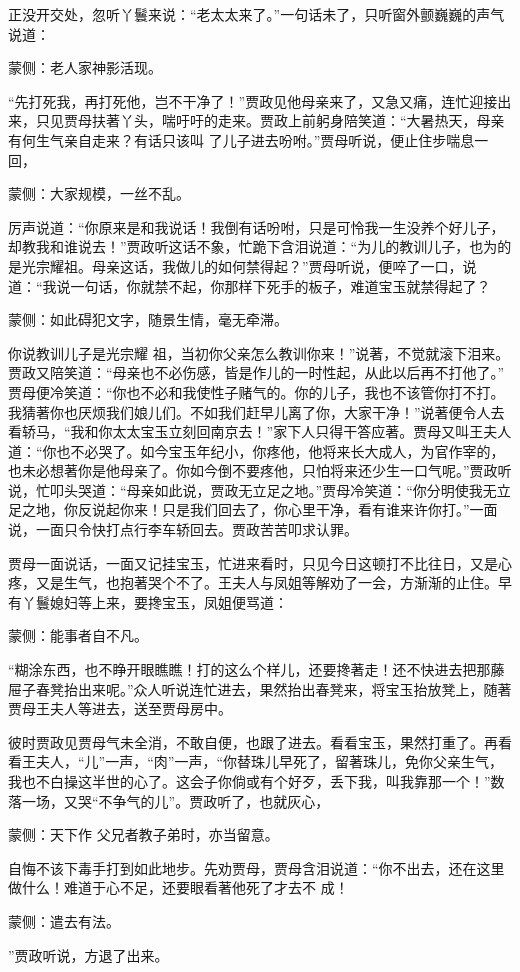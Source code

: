 \begin{parag}
    正没开交处，忽听丫鬟来说：“老太太来了。”一句话未了，只听窗外颤巍巍的声气说道：\begin{note}蒙侧：老人家神影活现。\end{note}“先打死我，再打死他，岂不干净了！”贾政见他母亲来了，又急又痛，连忙迎接出来，只见贾母扶著丫头，喘吁吁的走来。贾政上前躬身陪笑道：“大暑热天，母亲有何生气亲自走来？有话只该叫 了儿子进去吩咐。”贾母听说，便止住步喘息一回，\begin{note}蒙侧：大家规模，一丝不乱。\end{note}厉声说道：“你原来是和我说话！我倒有话吩咐，只是可怜我一生没养个好儿子，却教我和谁说去！”贾政听这话不象，忙跪下含泪说道：“为儿的教训儿子，也为的是光宗耀祖。母亲这话，我做儿的如何禁得起？”贾母听说，便啐了一口，说道：“我说一句话，你就禁不起，你那样下死手的板子，难道宝玉就禁得起了？\begin{note}蒙侧：如此碍犯文字，随景生情，毫无牵滞。\end{note}你说教训儿子是光宗耀 祖，当初你父亲怎么教训你来！”说著，不觉就滚下泪来。贾政又陪笑道：“母亲也不必伤感，皆是作儿的一时性起，从此以后再不打他了。” 贾母便冷笑道：“你也不必和我使性子赌气的。你的儿子，我也不该管你打不打。我猜著你也厌烦我们娘儿们。不如我们赶早儿离了你，大家干净！”说著便令人去看轿马，“我和你太太宝玉立刻回南京去！”家下人只得干答应著。贾母又叫王夫人道：“你也不必哭了。如今宝玉年纪小，你疼他，他将来长大成人，为官作宰的，也未必想著你是他母亲了。你如今倒不要疼他，只怕将来还少生一口气呢。”贾政听说，忙叩头哭道：“母亲如此说，贾政无立足之地。”贾母冷笑道：“你分明使我无立足之地，你反说起你来！只是我们回去了，你心里干净，看有谁来许你打。”一面说，一面只令快打点行李车轿回去。贾政苦苦叩求认罪。
\end{parag}


\begin{parag}
    贾母一面说话，一面又记挂宝玉，忙进来看时，只见今日这顿打不比往日，又是心疼，又是生气，也抱著哭个不了。王夫人与凤姐等解劝了一会，方渐渐的止住。早有丫鬟媳妇等上来，要搀宝玉，凤姐便骂道：\begin{note}蒙侧：能事者自不凡。\end{note}“糊涂东西，也不睁开眼瞧瞧！打的这么个样儿，还要搀著走！还不快进去把那藤 屉子春凳抬出来呢。”众人听说连忙进去，果然抬出春凳来，将宝玉抬放凳上，随著贾母王夫人等进去，送至贾母房中。
\end{parag}


\begin{parag}
    彼时贾政见贾母气未全消，不敢自便，也跟了进去。看看宝玉，果然打重了。再看看王夫人，“儿”一声，“肉”一声，“你替珠儿早死了，留著珠儿，免你父亲生气，我也不白操这半世的心了。这会子你倘或有个好歹，丢下我，叫我靠那一个！”数落一场，又哭“不争气的儿”。贾政听了，也就灰心，\begin{note}蒙侧：天下作 父兄者教子弟时，亦当留意。\end{note}自悔不该下毒手打到如此地步。先劝贾母，贾母含泪说道：“你不出去，还在这里做什么！难道于心不足，还要眼看著他死了才去不 成！\begin{note}蒙侧：遣去有法。\end{note}”贾政听说，方退了出来。
\end{parag}


